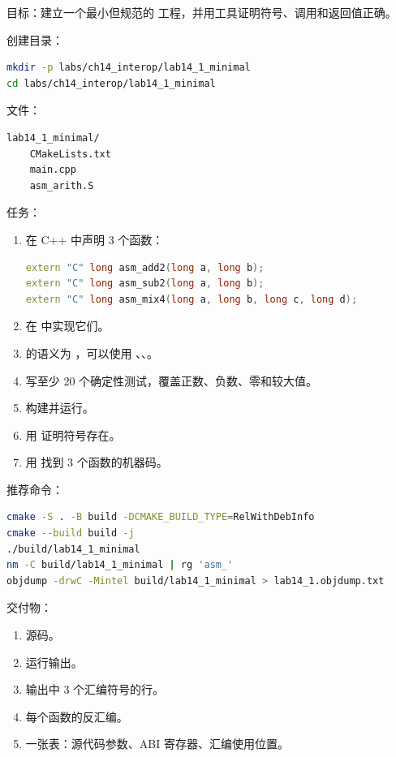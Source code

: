\begin{labbox}
目标：建立一个最小但规范的  工程，并用工具证明符号、调用和返回值正确。

创建目录：

\begin{lstlisting}[language=bash]
mkdir -p labs/ch14_interop/lab14_1_minimal
cd labs/ch14_interop/lab14_1_minimal
\end{lstlisting}

文件：

\begin{lstlisting}
lab14_1_minimal/
    CMakeLists.txt
    main.cpp
    asm_arith.S
\end{lstlisting}

任务：

\begin{enumerate}
  \item 在 C++ 中声明 3 个函数：
\begin{lstlisting}[language=C++]
extern "C" long asm_add2(long a, long b);
extern "C" long asm_sub2(long a, long b);
extern "C" long asm_mix4(long a, long b, long c, long d);
\end{lstlisting}
  \item 在  中实现它们。
  \item {} 的语义为 ，可以使用 、、。
  \item 写至少 20 个确定性测试，覆盖正数、负数、零和较大值。
  \item 构建并运行。
  \item 用  证明符号存在。
  \item 用  找到 3 个函数的机器码。
\end{enumerate}

推荐命令：

\begin{lstlisting}[language=bash]
cmake -S . -B build -DCMAKE_BUILD_TYPE=RelWithDebInfo
cmake --build build -j
./build/lab14_1_minimal
nm -C build/lab14_1_minimal | rg 'asm_'
objdump -drwC -Mintel build/lab14_1_minimal > lab14_1.objdump.txt
\end{lstlisting}

交付物：

\begin{enumerate}
  \item 源码。
  \item 运行输出。
  \item {} 输出中 3 个汇编符号的行。
  \item 每个函数的反汇编。
  \item 一张表：源代码参数、ABI 寄存器、汇编使用位置。
\end{enumerate}
\end{labbox}

